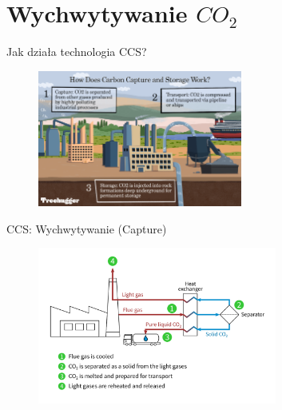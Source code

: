 \section{Wychwytywanie $CO_2$}

\begin{frame}{Jak działa technologia CCS?}
    \begin{figure}
        \centering
        \includegraphics[width=0.6\textwidth, frame]{images/CCS_treehugger.png}
    \end{figure}
\end{frame}

\begin{frame}{CCS: Wychwytywanie (Capture)}
    \begin{figure}
        \centering
        \includegraphics[width=0.7\textwidth, frame]{images/carbon-capture-how-it-works.png}

    \end{figure}
\end{frame}

